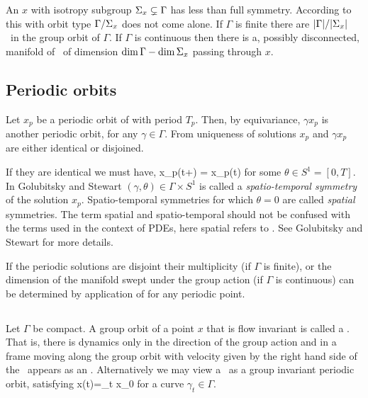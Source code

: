 An {\eqv} $x$ with isotropy subgroup
$\Sigma_{x}\subsetneq\Gamma$ has less than full symmetry.
According to  this {\eqv} with orbit
type $\Gamma/\Sigma_{x}$ does not come alone. If $\Gamma$ is
finite there are  $|\Gamma|/|\Sigma_{x}|$ \eqva\ in the group
orbit of $\Gamma$. If $\Gamma$ is continuous then there is a,
possibly disconnected, manifold of \eqva\ of dimension
$\dim \Gamma - \dim \Sigma_{x}$ passing through $x$.

\subsection{Periodic orbits}
\label{sec:poSym}

Let $x_p$ be a periodic orbit of  with period $T_p$. Then, by equivariance, $\gamma x_p$
is another periodic orbit, for any $\gamma\in\Gamma$. From uniqueness of solutions $x_p$ and $\gamma x_p$
are either identical or disjoined.

If they are identical we must have,
\beq
	\gamma x_p(t+\theta) = x_p(t)
\eeq
for some $\theta\in S^{1}=[0,T]$. In Golubitsky and Stewart $(\gamma,\theta)\in \Gamma \times S^1$ is called a \emph{spatio-temporal
symmetry} of the solution $x_p$. Spatio-temporal symmetries for which $\theta=0$ are called \emph{spatial}
symmetries.
The term spatial and spatio-temporal should not be confused with the terms used in the context of PDEs, here
spatial refers to \statesp. See Golubitsky and Stewart for more details.

If the periodic solutions are disjoint their multiplicity (if $\Gamma$ is finite), or the dimension
of the manifold swept under the group action (if $\Gamma$ is continuous) can be determined by application
of  for any periodic point.

\subsection{\Reqva}

Let $\Gamma$ be compact. A group orbit of a point $x$ that is flow invariant is called a \reqv.
That is, there is dynamics only in the direction of the group action and in a frame moving along the group orbit with velocity given by the right hand side of  the \reqv\ appears as an \eqv. Alternatively
we may view a \reqv\ as a group invariant periodic orbit, satisfying
\beq
	x(t)=\gamma_t x_0
\eeq
for a curve $\gamma_t\in\Gamma$.

